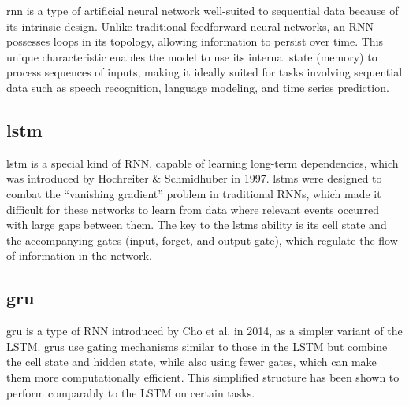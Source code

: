 \ac{rnn} is a type of artificial neural network well-suited to sequential data because of its intrinsic design.
Unlike traditional feedforward neural networks, an RNN possesses loops in its topology, allowing information to persist over time.
This unique characteristic enables the model to use its internal state (memory) to process sequences of inputs, making it ideally suited for tasks involving sequential data such as speech recognition, language modeling, and time series prediction\cite{elman_finding_1990}.

\subsection{\ac{lstm}}

\ac{lstm} is a special kind of RNN, capable of learning long-term dependencies, which was introduced by Hochreiter & Schmidhuber in 1997\cite{lstm-hochreiter}.
\acp{lstm} were designed to combat the ``vanishing gradient'' problem in traditional RNNs, which made it difficult for these networks to learn from data where relevant events occurred with large gaps between them.
The key to the \acp{lstm} ability is its cell state and the accompanying gates (input, forget, and output gate), which regulate the flow of information in the network.

\subsection{\ac{gru}}

\ac{gru} is a type of RNN introduced by Cho et al. in 2014, as a simpler variant of the LSTM.
\acp{gru} use gating mechanisms similar to those in the LSTM but combine the cell state and hidden state, while also using fewer gates, which can make them more computationally efficient\cite{cho_learning_2014}.
This simplified structure has been shown to perform comparably to the LSTM on certain tasks.


